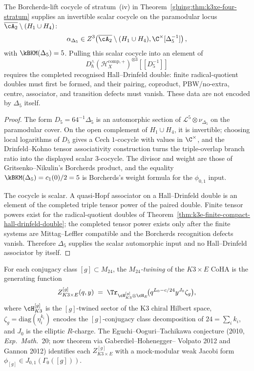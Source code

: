 \begin{proposition}
\label{gluing:prop:Delta5-associator}
The Borcherds-lift cocycle of stratum~(iv) in
Theorem~\ref{gluing:thm:k3xe-four-stratum} supplies an invertible
scalar cocycle on the paramodular locus
\(\overline{\cA_2}\setminus(H_1\cup H_4)\):
\[
 \alpha_{\Delta_5}
 \in
 Z^3\!\left(
 \overline{\cA_2}\setminus(H_1\cup H_4),
 \C^\times[\Delta_5^{-1}]
 \right),
\]
with $\kBKM(\Delta_5)=5$. Pulling this scalar cocycle into an element
of
\[
 D_\hbar^\wedge(\mathcal H_X^{\mathrm{comp},+})^{\otimes 3}
 [\![D_5^{-1}]\!]
\]
requires the completed recognised Hall--Drinfeld double: finite
radical-quotient doubles must first be formed, and their pairing,
coproduct, PBW/no-extra, centre, associator, and transition defects
must vanish. These data are not encoded by \(\Delta_5\) itself.
\end{proposition}

\begin{proof}
The form \(D_5=64^{-1}\Delta_5\) is an automorphic section of
\(\mathcal L^5\otimes\nu_{\Delta_5}\) on the paramodular cover.
On the open complement of \(H_1\cup H_4\), it is invertible; choosing
local logarithms of \(D_5\) gives a Cech \(1\)-cocycle with values in
\(\C^\times\), and the Drinfeld--Kohno tensor associativity
construction turns the triple-overlap branch ratio into the displayed
scalar \(3\)-cocycle. The divisor and weight are those of
Gritsenko--Nikulin's Borcherds product, and the equality
\(\kBKM(\Delta_5)=c_1(0)/2=5\) is Borcherds's weight formula for the
\(\phi_{0,1}\) input.

The cocycle is scalar. A quasi-Hopf associator on a Hall--Drinfeld
double is an element of the completed triple tensor power of the paired
double. Finite tensor powers exist for the radical-quotient doubles of
Theorem~\ref{thm:k3e-finite-compact-hall-drinfeld-double}; the
completed tensor power exists only after the finite systems are
Mittag--Leffler compatible and the Borcherds recognition defects
vanish. Therefore \(\Delta_5\) supplies the scalar automorphic input
and no Hall--Drinfeld associator by itself.
\end{proof}

\begin{definition}
\label{gluing:def:M24-twining}
For each conjugacy class $[g] \subset M_{24}$, the
\emph{$M_{24}$-twining} of the $K3 \times E$ CoHA is the
generating function
\[
 Z^{[g]}_{K3 \times E}(q, y) \;=\;
 \Tr_{\cH_{K3}^{[g]} \otimes \cH_E}\!\bigl(q^{L_0 - c/24} y^{J_0}
 \zeta_g\bigr),
\]
where $\cH_{K3}^{[g]}$ is the $[g]$-twined sector of the K3 chiral
Hilbert space, $\zeta_g = \mathrm{diag}(\eta^{k_i}_i)$ encodes the
$[g]$-conjugacy class decomposition of $24 = \sum_i k_i$, and $J_0$
is the elliptic $R$-charge. The Eguchi--Ooguri--Tachikawa conjecture
(2010, \emph{Exp.\ Math.}~20; now theorem via Gaberdiel--Hohenegger--
Volpato 2012 and Gannon 2012) identifies each $Z^{[g]}_{K3 \times E}$
with a mock-modular weak Jacobi form $\phi_{[g]} \in J_{0,1}(\Gamma_0([g]))$.
\end{definition}

